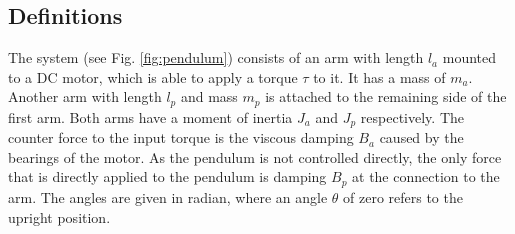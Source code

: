 \subsection{Definitions}
The system (see Fig. \ref{fig:pendulum}) consists of an arm with length $l_a$ 
mounted to a DC motor, which is 
able to apply a torque $\tau$ to it. It has a mass of $m_a$. Another arm with 
length $l_p$ and mass 
$m_p$
is attached to the remaining side of the 
first arm. Both arms have a moment of inertia $J_a$ and $J_p$ respectively. The 
counter force to the input torque is the viscous damping $B_a$ caused by the 
bearings of the motor. As the pendulum is not controlled directly, the only 
force that is directly applied to the pendulum is damping $B_p$ at the 
connection to 
the arm. The angles are given in radian, where an angle $\theta$ of zero 
refers to the upright position.

